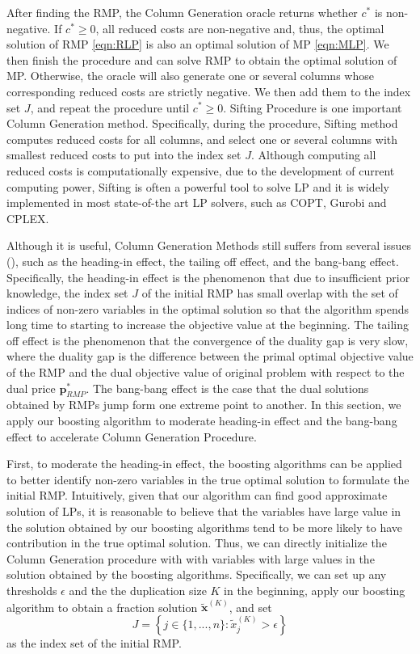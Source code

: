 \documentclass{article} %
\begin{document}
After finding the RMP, the Column Generation oracle returns whether $c^*$ is non-negative. If $c^*\geq0$, all reduced costs are non-negative and, thus, the optimal solution of RMP \eqref{eqn:RLP} is also an optimal solution of MP \eqref{eqn:MLP}. We then finish the procedure and can solve RMP to obtain the optimal solution of MP. Otherwise, the oracle will also generate one or several columns whose corresponding reduced costs are strictly negative. We then add them to the index set $J$, and repeat the procedure until $c^*\geq0$. Sifting Procedure is one important Column Generation method. Specifically, during the procedure, Sifting method computes reduced costs for all columns, and select one or several columns with smallest reduced costs to put into the index set $J$. Although computing all reduced costs is computationally expensive, due to the development of current computing power, Sifting is often a powerful tool to solve LP and it is widely implemented in most state-of-the art LP solvers, such as COPT, Gurobi and CPLEX. 

Although it is useful, Column Generation Methods still suffers from several issues (\cite{vanderbeck2005implementing}), such as the heading-in effect, the tailing off effect, and the bang-bang effect.  Specifically, the heading-in effect is the phenomenon that due to insufficient prior knowledge, the index set $J$ of the initial RMP has small overlap with the set of indices of non-zero variables in the optimal solution so that the algorithm spends long time to starting to increase the objective value at the beginning. The tailing off effect is the phenomenon that the convergence of the duality gap is very slow, where the duality gap is the difference between the primal optimal objective value of the RMP and the dual objective value of original problem with respect to the dual price $\bm{p}_{RMP}^*$. The bang-bang effect is the case that the dual solutions obtained by RMPs jump form one extreme point to another. In this section, we apply our boosting algorithm to moderate heading-in effect and the bang-bang effect to accelerate Column Generation Procedure.

First, to moderate the heading-in effect, the boosting algorithms can be applied to better identify non-zero variables in the true optimal solution to formulate the initial RMP. Intuitively, given that our algorithm can find good approximate solution of LPs, it is reasonable to believe that the variables have large value in the solution obtained by our boosting algorithms tend to be more likely to have contribution in the true optimal solution. Thus, we can directly initialize the Column Generation procedure with with variables with large values in the solution obtained by the boosting algorithms. Specifically, we can set up any thresholds $\epsilon$ and the the duplication size $K$ in the beginning, apply our boosting algorithm to obtain a fraction solution $\tilde{\bm{x}}^{(K)}$, and set 
$$
    J=\left\{j\in\{1,...,n\}: \tilde{x}_j^{(K)}>\epsilon\right\}
$$
as the index set of the initial RMP. 
\end{document}
